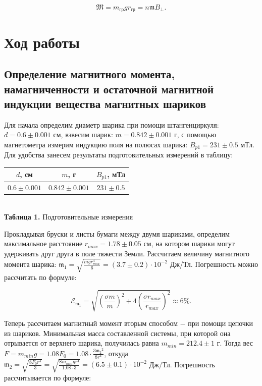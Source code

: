 \documentclass[a4paper,12pt]{article} %
\begin{document}
$$
\mathfrak{M} = m_\text{гр}gr_\text{гр} = n\mathfrak{m}B_{\perp}.
$$

\section{Ход работы}

\subsection{Определение магнитного момента, намагниченности и остаточной магнитной индукции вещества магнитных шариков}

\hfill \break Для начала определим диаметр шарика при помощи штангенциркуля: $d = 0.6 \pm 0.001$ см, взвесим шарик: $m = 0.842  \pm 0.001$ г, с помощью магнетометра измерим индукцию поля на полюсах шарика: $B_{p1} = 231 \pm 0.5$ мТл. Для удобства занесем результаты подготовительных измерений в таблицу:

\begin{center}
\begin{tabular}{|c|c|c|}\hline
$d$, см&$m$, г&$B_{p1}$, мТл\\\hline
$0.6 \pm 0.001$&$0.842 \pm 0.001$&$231 \pm 0.5$\\\hline
\end{tabular}\\
\hfill \break \textbf {Таблица 1.} Подготовительные измерения~\\
\end{center}

\hfill \break Прокладывая бруски и листы бумаги между двумя шариками, определим максимальное расстояние $r_{max} = 1.78 \pm 0.05$ см, на котором шарики могут удерживать друг друга в поле тяжести Земли. Рассчитаем величину магнитного момента шарика: $\mathfrak{m}_{1} = \sqrt{\frac{mgr^4_{max}}{6}} = (3.7 \pm 0.2) \cdot 10^{-2}$ Дж/Тл. Погрешность можно рассчитать по формуле:

$$
\mathcal{E}_{\mathfrak{m}_{1}} = \sqrt{(\frac{\sigma{m}}{m})^2 + 4(\frac{\sigma{r_{max}}}{r_{max}})^2} \approx 6 \%.
$$

\hfill \break Теперь рассчитаем магнитный момент вторым способом $-$ при помощи цепочки из шариков. Минимальная масса составленной системы, при которой она отрывается от верхнего шарика, получилась равна $m_{min} = 212.4 \pm 1$ г. Тогда вес $F = m_{min}g = 1.08F_{0} = 1.08 \cdot \frac{3\mathfrak{m_{2}}^2}{8r^4}$, откуда $\mathfrak{m}_{2} = \sqrt{\frac{8F_{0}r^4}{3}} = \sqrt{\frac{8m_{min}gr^4}{1.08 \cdot 3}} = (6.5 \pm 0.1) \cdot 10^{-2}$ Дж/Тл. Погрешность рассчитывается по формуле:
\end{document}
